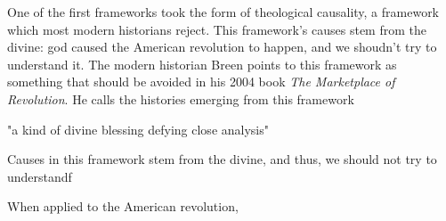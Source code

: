 \documentclass[letterpaper]{article}
\begin{document}
One of the first frameworks took the form of theological causality, a
framework which most modern historians reject. This framework's causes
stem from the divine: god caused the American revolution to happen, and
we shoudn't try to understand it. The modern historian Breen points to
this framework as something that should be avoided in his 2004 book \emph{The
Marketplace of Revolution}. He calls the histories emerging from this
framework

"a kind of divine blessing defying close analysis"

Causes in this framework stem from the divine, and thus, we should not
try to understandf

When applied to the American revolution,
\end{document}
